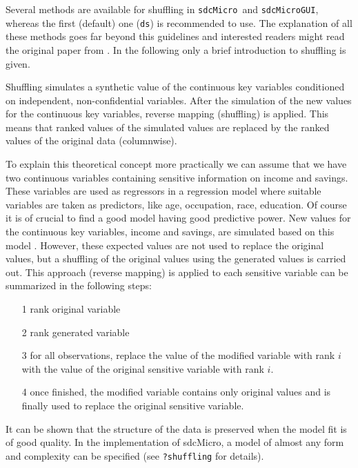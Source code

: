 \documentclass[12pt]{scrartcl}\usepackage[]{graphicx}\usepackage[]{color}
\newcommand{\sdcMicro}{\texttt{sdcMicro}}
\newcommand{\sdcMicroGUI}{\texttt{sdcMicroGUI}}
\begin{document}
Several methods are available for shuffling in \sdcMicro \ and \sdcMicroGUI , whereas the first (default) one (\texttt{ds}) is recommended to use. The explanation of all these methods goes far beyond this guidelines and interested readers might read the original paper from \cite{Muh06}. In the following only a brief introduction to shuffling is given.

Shuffling \citep{Muh06} simulates a synthetic value of the continuous key variables conditioned on independent, non-confidential variables. After the simulation of the new values for the continuous key variables, reverse mapping (shuffling) is applied. This means that ranked values of the simulated values are replaced by the ranked values of the original data (columnwise).

To explain this theoretical concept more practically we can assume that we have two continuous variables containing sensitive information on income and savings. These variables are used as regressors in a regression model where suitable variables are taken as predictors, like age, occupation, race, education. Of course it is of crucial to find a good model having good predictive power. New values for the continuous key variables, income and savings, are simulated based on this model \citep[for details, have a look at][]{Muh06}. However, these expected values are not used to replace the original values, but a shuffling of the original values using the generated values is carried out. This approach (reverse mapping) is applied to each sensitive variable can be summarized in the following steps:

\begin{itemize}
\item[1] rank original variable
\item[2] rank generated variable
\item[3] for all observations, replace the value of the modified variable with rank $i$ with the value of the original sensitive variable with rank $i$.
\item[4] once finished, the modified variable contains only original values and is finally used to replace the original sensitive variable.
\end{itemize}

It can be shown that the structure of the data is preserved when the model fit is of good quality. In the implementation of sdcMicro, a model of almost any form and complexity can be specified (see \lstinline{?shuffling} for details).
\end{document}
